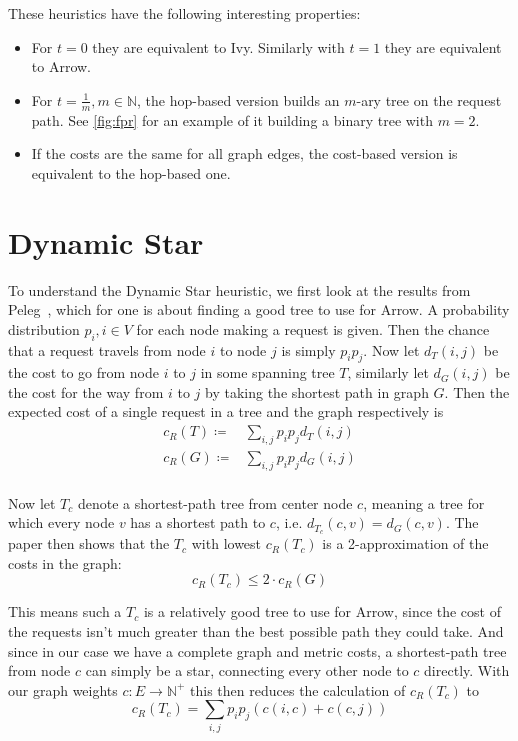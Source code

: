 \documentclass[a4paper, oneside]{discothesis}
\begin{document}
These heuristics have the following interesting properties:
\begin{itemize}
\item For $t=0$ they are equivalent to Ivy. Similarly with $t=1$ they are equivalent to Arrow.
\item For $t=\frac{1}{m}, m\in\mathbb{N}$, the hop-based version builds an $m$-ary tree on the request path. See \autoref{fig:fpr} for an example of it building a binary tree with $m=2$.
\item If the costs are the same for all graph edges, the cost-based version is equivalent to the hop-based one.
\end{itemize}

\newpage
\section{Dynamic Star}
\label{alg:dynstar}

To understand the Dynamic Star heuristic, we first look at the results from Peleg~\cite{Peleg}, which for one is about finding a good tree to use for Arrow. A probability distribution $p_i, i\in V$ for each node making a request is given. Then the chance that a request travels from node $i$ to node $j$ is simply $p_ip_j$. Now let $d_T(i,j)$ be the cost to go from node $i$ to $j$ in some spanning tree $T$, similarly let $d_G(i,j)$ be the cost for the way from $i$ to $j$ by taking the shortest path in graph $G$. Then the expected cost of a single request in a tree and the graph respectively is
\begin{equation}
\begin{split}
c_R(T)\coloneqq & \sum_{i,j}p_ip_jd_T(i,j) \\
c_R(G)\coloneqq & \sum_{i,j}p_ip_jd_G(i,j) \\
\end{split}
\end{equation}

Now let $T_c$ denote a shortest-path tree from center node $c$, meaning a tree for which every node $v$ has a shortest path to $c$, i.e. $d_{T_c}(c,v)=d_G(c,v)$. The paper then shows that the $T_c$ with lowest $c_R(T_c)$ is a 2-approximation of the costs in the graph:
\begin{equation}
c_R(T_c)\leq 2\cdot c_R(G)
\end{equation}

This means such a $T_c$ is a relatively good tree to use for Arrow, since the cost of the requests isn't much greater than the best possible path they could take. And since in our case we have a complete graph and metric costs, a shortest-path tree from node $c$ can simply be a star, connecting every other node to $c$ directly. With our graph weights $c:E\to\mathbb{N}^+$ this then reduces the calculation of $c_R(T_c)$ to
\begin{equation}
\label{dynstarc}
c_R(T_c)=\sum_{i,j}p_ip_j(c(i,c)+c(c,j))
\end{equation}
\end{document}
